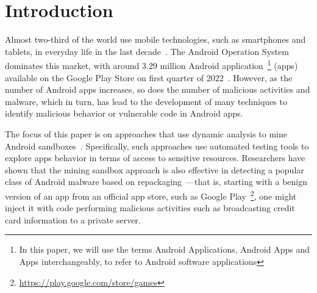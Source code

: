 \section{Introduction}\label{sec:introduction}

Almost two-third of the world use mobile technologies, such as smartphones and tablets, in everyday life in the last decade~\cite{Comscore,DBLP:journals/tse/MartinSJZH17}. 
The Android Operation System dominates this market, with around 3.29 
million Android application~\footnote{In this paper, we will use the terms Android Applications, Android Apps and Apps interchangeably, to refer to Android software applications} (apps) available on the Google Play Store on first quarter of 2022~\cite{Statista}. 
However, as the number of Android apps increases, so does the number of malicious activities and 
malware, which in turn, has lead to the development of many techniques
to identify malicious behavior or vulnerable code in Android apps.

The focus of this paper is on
%
approaches that use dynamic analysis to mine Android sandboxes~\cite{DBLP:conf/icse/JamrozikSZ16}. 
Specifically, such approaches use automated testing tools 
to explore apps behavior in terms of access to sensitive resources. Researchers have shown that the mining sandbox approach is also effective in detecting a popular class of Android malware based on repackaging~\cite{DBLP:conf/wcre/BaoLL18,le2018towards}---that is, starting with a benign version of an app from an official app store, such as Google Play~\footnote{\url{https://play.google.com/store/games}}, one might inject it with code performing malicious activities such as broadcasting credit card information to a private server.~\cite{DBLP:journals/tse/LiBK21} %

